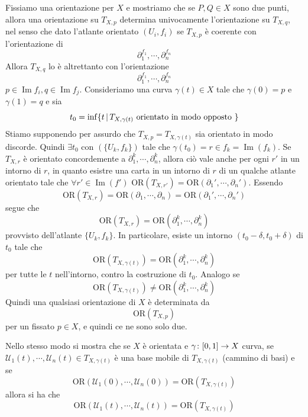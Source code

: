\documentclass[a4paper]{article}
\begin{document}
\begin{snippetproof}{}
    Fissiamo una orientazione per \(X\) e mostriamo che
    se \(P, Q \in X\) sono due punti, allora una orientazione su \(T_{X,p}\)
    determina univocamente l'orientazione su \(T_{X,q}\),
    nel senso che dato l'atlante
    orientato \((U_i, f_i)\)
    se \(T_{X,p}\) è coerente con l'orientazione di
    \[
        \partial_1^{f_1}, \cdots,
        \partial_n^{f_n}
    \]
    Allora \(T_{X,q}\)
    lo è altrettanto con l'orientazione
    \[
        \partial_1^{f_1}, \cdots,
        \partial_n^{f_n}
    \]
    \(p \in \operatorname{Im}f_i, q \in \operatorname{Im}f_j\).
    Consideriamo una curva \(\gamma(t) \in X\)
    tale che \(\gamma(0) = p\) e \(\gamma(1) = q\) e sia \[
        t_0 = \inf \{
            t \,|\, T_{X,\gamma(t)} \text{ orientato in modo opposto }    
        \}
    \]
    Stiamo supponendo per assurdo che \(T_{X,p} = T_{X, \gamma(t)}\)
    sia orientato in modo discorde.
    Quindi \(\exists t_0\) con \((\{U_k, f_k\})\)
    tale che \(\gamma(t_0) = r \in f_k = \operatorname{Im}(f_k)\).
    Se \(T_{X,r}\) è orientato concordemente
    a \(\partial^k_1, \cdots, \partial^k_n\),
    allora ciò vale anche per ogni \(r'\)
    in un intorno di \(r\),
    in quanto esistre una carta in un intorno di \(r\)
    di un qualche atlante orientato
    tale che \(\forall r' \in \operatorname{Im}(f')\)
    \(\text{OR}(T_{X,r'}) = \text{OR}(\partial_1', \cdots, \partial_n')\).
    Essendo \[
        \text{OR}(T_{X,r})
        = \text{OR}(\partial_1, \cdots, \partial_n)
        = \text{OR}(\partial_1', \cdots, \partial_n')
    \]
    segue che
    \[
         \text{OR}(T_{X,r}) =  \text{OR}(\partial_1^k, \cdots, \partial_n^k)
    \]
    provvisto dell'atlante \(\{U_k, f_k\}\).
    In particolare, esiste un intorno \((t_0 - \delta, t_0 + \delta)\)
    di \(t_0\)
    tale che \[
        \text{OR}(T_{X, \gamma(t)})
        = \text{OR}(\partial_1^k, \cdots, \partial_n^k)
    \]
    per tutte le \(t\) nell'intorno,
    contro la costruzione di \(t_0\).
    Analogo se \[
        \text{OR}(T_{X, \gamma(t)})
        \neq \text{OR}(\partial_1^k, \cdots, \partial_n^k)
    \]
    Quindi una qualsiasi orientazione di \(X\) è determinata da
    \[
        \text{OR}(T_{X,p})
    \]
    per un fissato \(p \in X\), e quindi ce ne sono solo due.
\end{snippetproof}

\begin{snippetcorollary}{}
    Nello stesso modo si mostra che se \(X\)
    è orientata e \(\gamma \colon [0,1] \to X\) curva,
    se \(\mathcal U_1(t), \cdots, \mathcal U_n(t) \in T_{X,\gamma(t)}\)
    è una base mobile di \(T_{X, \gamma(t)}\)
    (cammino di basi)
    e se \[
        \text{OR}(\mathcal U_1(0), \cdots, \mathcal U_n(0))
        = \text{OR}(T_{X, \gamma(t)})
    \]
    allora si ha che 
    \[
        \text{OR}(\mathcal U_1(t), \cdots, \mathcal U_n(t))
        = \text{OR}(T_{X, \gamma(t)})
    \]
\end{snippetcorollary}
\end{document}

